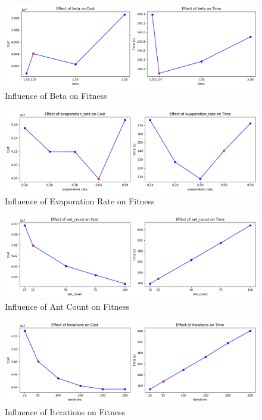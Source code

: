 \documentclass{article}
\begin{document}
\begin{figure}[H]
    \centering
    \includegraphics[width=\linewidth]{effect_of_beta.png}
    \caption{Influence of Beta on Fitness}
    \label{fig:beta}
\end{figure}

\begin{figure}[H]
    \centering
    \includegraphics[width=\linewidth]{effect_of_evaporation_rate.png}
    \caption{Influence of Evaporation Rate on Fitness}
    \label{fig:evaporation_rate}
\end{figure}

\begin{figure}[H]
    \centering
    \includegraphics[width=\linewidth]{effect_of_ant_count.png}
    \caption{Influence of Ant Count on Fitness}
    \label{fig:ant_count}
\end{figure}

\begin{figure}[H]
    \centering
    \includegraphics[width=\linewidth]{effect_of_iterations.png}
    \caption{Influence of Iterations on Fitness}
    \label{fig:iterations}
\end{figure}
\end{document}
